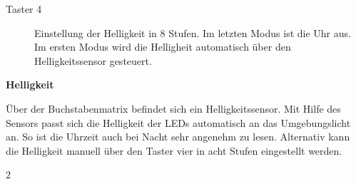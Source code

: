 \begin{multicols}{2}
\begin{description}
\item[Taster 4] Einstellung der Helligkeit in 8 Stufen. Im letzten Modus ist die Uhr aus. Im ersten Modus wird die Helligheit automatisch über den Helligkeitssensor gesteuert.
\end {description}
 
\textbf{Helligkeit}

Über der Buchstabenmatrix befindet sich ein Helligkeitssensor. Mit Hilfe des Sensors passt sich die Helligkeit der LEDs automatisch an das Umgebungslicht an. So ist die Uhrzeit auch bei Nacht sehr angenehm zu lesen. Alternativ kann die Helligkeit manuell über den Taster vier in acht Stufen eingestellt werden.

\end{multicols}{2}